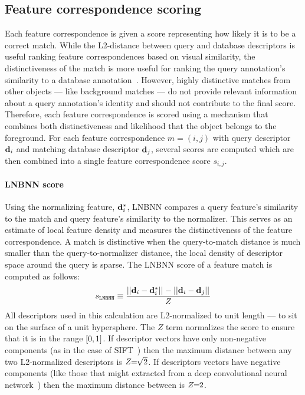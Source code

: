     \subsection{Feature correspondence scoring}
        Each feature correspondence is given a score representing how likely it is to be a correct match.
        While the L2-distance between query and database descriptors is useful ranking feature correspondences
          based on visual similarity, the distinctiveness of the match is more useful for ranking the query
          annotation's similarity to a database annotation~\cite{lowe_distinctive_2004,
          arandjelovic_dislocation_2015, mccann_local_2012}.
        However, highly distinctive matches from other objects --- like background matches --- do not provide
          relevant information about a query annotation's identity and should not contribute to the final score.
        Therefore, each feature correspondence is scored using a mechanism that combines both distinctiveness and
          likelihood that the object belongs to the foreground.
        For each feature correspondence $m = (i, j)$ with query descriptor $\mathbf{d}_i$ and matching database
          descriptor $\mathbf{d}_j$, several scores are computed which are then combined into a single feature
          correspondence score $s_{i,j}$.

        \paragraph{LNBNN score}\label{sec:lnbnnscore}

            Using the normalizing feature, $\mathbf{d}^{*}_{i}$, LNBNN compares a query feature's similarity to the
              match and query feature's similarity to the normalizer.
            This serves as an estimate of local feature density and measures the distinctiveness of the feature
              correspondence.
            A match is distinctive when the query-to-match distance is much smaller than the query-to-normalizer
              distance, \ie{} the local density of descriptor space around the query is sparse.
            The LNBNN score of a feature match is computed as follows:
            \begin{equation}\label{eqn:lnbnn}
                s_{\tt{LNBNN}} \equiv \frac{||\mathbf{d}_i - \mathbf{d}^{*}_{i}||_{} - ||\mathbf{d}_i - \mathbf{d}_j||_{}}{Z}
            \end{equation}
            All descriptors used in this calculation are L2-normalized to unit length --- \ie{} to sit on the
              surface of a unit hypersphere.
            The $Z$ term normalizes the score to ensure that it is in the range $[0, 1]$.
            If descriptor vectors have only non-negative components (as in the case of
              SIFT~\cite{lowe_distinctive_2004}) then the maximum distance between any two L2-normalized
              descriptors is $Z\mkern-6mu=\mkern-6mu\sqrt{2}$.
            If descriptors vectors have negative components (like those that might extracted from a deep
              convolutional neural network~\cite{zagoruyko_learning_2015}) then the maximum distance between is
              $Z\mkern-6mu=\mkern-6mu2$.


